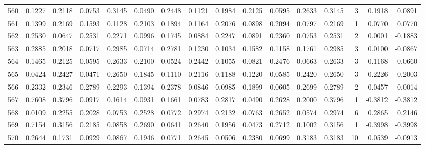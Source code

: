 \begin{tabular}{lrrrrrrrrrrrrrrr}
560 &      0.1227 &  0.2118 &  0.0753 &  0.3145 &  0.0490 &  0.2448 &  0.1121 &  0.1984 &  0.2125 &  0.0595 &   0.2633 &     0.3145 &      3 &                    0.1918 &                     0.0891 \\
561 &      0.1399 &  0.2169 &  0.1593 &  0.1128 &  0.2103 &  0.1894 &  0.1164 &  0.2076 &  0.0898 &  0.2094 &   0.0797 &     0.2169 &      1 &                    0.0770 &                     0.0770 \\
562 &      0.2530 &  0.0647 &  0.2531 &  0.2271 &  0.0996 &  0.1745 &  0.0884 &  0.2247 &  0.0891 &  0.2360 &   0.0753 &     0.2531 &      2 &                    0.0001 &                    -0.1883 \\
563 &      0.2885 &  0.2018 &  0.0717 &  0.2985 &  0.0714 &  0.2781 &  0.1230 &  0.1034 &  0.1582 &  0.1158 &   0.1761 &     0.2985 &      3 &                    0.0100 &                    -0.0867 \\
564 &      0.1465 &  0.2125 &  0.0595 &  0.2633 &  0.2100 &  0.0524 &  0.2442 &  0.1055 &  0.0821 &  0.2476 &   0.0663 &     0.2633 &      3 &                    0.1168 &                     0.0660 \\
565 &      0.0424 &  0.2427 &  0.0471 &  0.2650 &  0.1845 &  0.1110 &  0.2116 &  0.1188 &  0.1220 &  0.0585 &   0.2420 &     0.2650 &      3 &                    0.2226 &                     0.2003 \\
566 &      0.2332 &  0.2346 &  0.2789 &  0.2293 &  0.1394 &  0.2378 &  0.0846 &  0.0985 &  0.1899 &  0.0605 &   0.2699 &     0.2789 &      2 &                    0.0457 &                     0.0014 \\
567 &      0.7608 &  0.3796 &  0.0917 &  0.1614 &  0.0931 &  0.1661 &  0.0783 &  0.2817 &  0.0490 &  0.2628 &   0.2000 &     0.3796 &      1 &                   -0.3812 &                    -0.3812 \\
568 &      0.0109 &  0.2255 &  0.2028 &  0.0753 &  0.2528 &  0.0772 &  0.2974 &  0.2132 &  0.0763 &  0.2652 &   0.0574 &     0.2974 &      6 &                    0.2865 &                     0.2146 \\
569 &      0.7154 &  0.3156 &  0.2185 &  0.0858 &  0.2690 &  0.0641 &  0.2640 &  0.1956 &  0.0473 &  0.2712 &   0.1002 &     0.3156 &      1 &                   -0.3998 &                    -0.3998 \\
570 &      0.2644 &  0.1731 &  0.0929 &  0.0867 &  0.1946 &  0.0771 &  0.2645 &  0.0506 &  0.2380 &  0.0699 &   0.3183 &     0.3183 &     10 &                    0.0539 &                    -0.0913 \\

\end{tabular}
